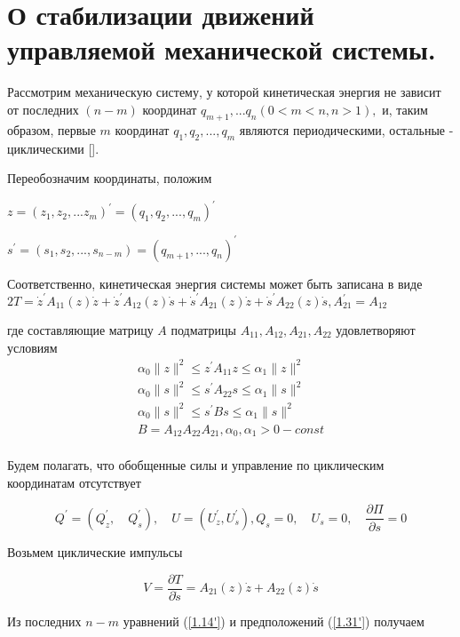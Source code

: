 \section{О стабилизации движений управляемой механической системы.} \label{p13}

Рассмотрим механическую систему, у которой кинетическая энергия не зависит от последних $(n-m)$ координат $q_{m+1},... q_n (0 < m < n, n > 1),$ и, таким образом, первые $m$ координат $q_1, q_2, ... , q_m$ являются периодическими, остальные - циклическими [].

Переобозначим координаты, положим

$z = (z_1, z_2, ... z_m)^{'} = (q_1, q_2, ..., q_m)^{'}$

$s^{'} = (s_1, s_2, ... , s_{n-m}) = (q_{m + 1}, ..., q_n)^{'}$

Соответственно, кинетическая энергия системы может быть записана в виде $2T = \dot z^{'} A_{11} (z) \dot z + \dot z^{'} A_{12} (z) \dot s + \dot s^{'} A_{21} (z) \dot z + \dot s^{'} A_{22} (z) \dot s, A_21^{'} = A_{12}$

где составляющие матрицу $A$ подматрицы $A_{11}, A_{12}, A_{21}, A_{22}$ удовлетворяют условиям 
$$
\begin{array}{l}
\alpha_0 \| z \|^2 \le z^{'} A_{11} z \le \alpha_1  \| z \|^2\\
\alpha_0 \| s \|^2 \le s^{'} A_{22} s \le \alpha_1  \| s \|^2\\
\alpha_0 \| s \|^2 \le s^{'} B s \le \alpha_1  \| s \|^2\\
B = A_{12} A_{22} A_{21}, \alpha_0, \alpha_1 > 0 - const\\
\end{array}
$$

Будем полагать, что обобщенные силы и управление по циклическим координатам отсутствует

\begin{equation} \label{1.31'}
Q^{'} = (Q_{z}^{'}, \quad Q_{s}^{'}), \quad U = (U_{z}^{'}, U_{s}^{'}), Q_s = 0, \quad U_s = 0, \quad \frac{\partial \Pi}{\partial s} = 0
\end{equation}

Возьмем циклические импульсы

\begin{equation} \label{1.32'}
V = \frac{\partial T}{\partial \dot s} = A_{21} (z) \dot z + A_{22} (z) \dot s
\end{equation}

Из последних $n - m$ уравнений (\ref{1.14'}) и предположений (\ref{1.31'}) получаем 

